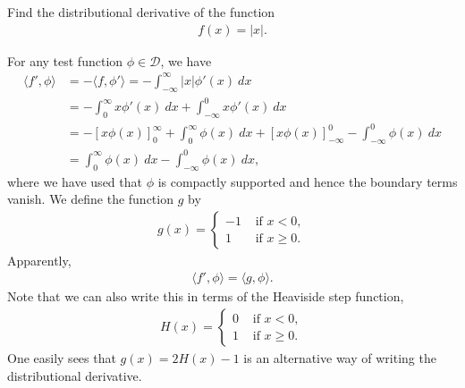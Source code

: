 \documentclass[11pt]{article}
\begin{document}
\begin{exercise}
    Find the distributional derivative of the function 
    \begin{align}
        f(x) = |x|.
    \end{align}
\end{exercise}
\begin{solution}
    For any test function $\phi \in \mathcal{D}$, we have 
    \begin{align}
        \langle f', \phi \rangle 
        &= 
        - \langle f, \phi' \rangle 
        = 
        - \int_{-\infty}^{\infty} |x| \phi'(x) \ dx 
        \\&
        = 
        - \int_0^\infty x \phi'(x) \ dx + \int_{-\infty}^0 x\phi'(x) \ dx 
        \\
        &= 
        -[x \phi(x)]_0^\infty + \int_0^\infty \phi(x) \ dx + [x \phi(x)]_{-\infty}^0 - \int_{-\infty}^0 \phi(x) \ dx 
        \\
        &= 
        \int_0^\infty \phi(x) \ dx - \int_{-\infty}^0 \phi(x) \ dx 
        ,
    \end{align}
    where we have used that $\phi$ is compactly supported and hence the boundary terms vanish.
    We define the function $g$ by 
    \begin{align}
        g(x) = \begin{cases} -1 & \text{ if } x < 0, \\ 1 & \text{ if } x \geq 0. \end{cases}
    \end{align}
    Apparently,
    \begin{align}
        \langle f', \phi \rangle = \langle g , \phi \rangle. 
    \end{align}
    Note that we can also write this in terms of the Heaviside step function, 
    \begin{align}
        H(x) = \begin{cases}
                0 & \text{ if } x    < 0, 
                \\
                1 & \text{ if } x \geq 0.
               \end{cases}
    \end{align}
    One easily sees that $g(x) = 2 H(x) - 1$ is an alternative way of writing the distributional derivative. 
\end{solution}
\end{document}
